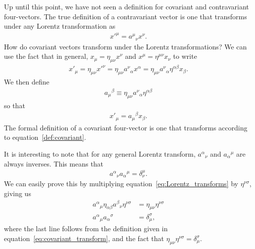\documentclass[titlepage,letterpaper,onecolumn,11pt,final]{report}
\numberwithin{equation}{section}
\numberwithin{figure}{section}
\begin{document}
Up until this point, we have not seen a definition for covariant and contravariant four-vectors. The true definition of a contravariant vector is one that transforms under any Lorentz transformation as
\begin{gather}
	\label{def:contravariant}
	{x'}^{\mu} = {a^{\mu}}_{\nu} x^{\nu}.
\end{gather}
%
How do covariant vectors transform under the Lorentz transformations? We can use the fact that in general, $x_{\mu} = \eta_{\mu \nu} x^{\nu}$ and $x^{\mu} = \eta^{\mu \nu} x_{\nu}$ to write
\begin{gather}
	{x'}_{\mu} = \eta_{\mu \nu} {x'}^{\nu} = \eta_{\mu \nu} {a^{\nu}}_{\alpha} x^{\alpha} = \eta_{\mu \nu} {a^{\nu}}_{\alpha} \eta^{\alpha \beta} x_{\beta} .
\end{gather}
%
We then define
\begin{gather}
	\label{eq:covariant_transform}
	{a_{\mu}}^{\beta} \equiv \eta_{\mu \nu} {a^{\nu}}_{\alpha} \eta^{\alpha \beta}
\end{gather}
so that
\begin{gather}
	\label{def:covariant}
	{x'}_{\mu} = {a_{\mu}}^{\beta} x_{\beta} .
\end{gather}
The formal definition of a covariant four-vector is one that transforms according to equation~\ref{def:covariant}. 

It is interesting to note that for any general Lorentz transform, ${a^{\alpha}}_{\nu}$ and ${a_{\alpha}}^{\mu}$ are always inverses. This means that 
\begin{gather}
	{a^{\alpha}}_{\nu} {a_{\alpha}}^{\mu} = \delta^{\mu}_{\nu} .
\end{gather}
%
We can easily prove this by multiplying equation~\ref{eq:Lorentz_transforms} by $\eta^{\nu \sigma}$, giving us
\begin{subequations}
\begin{align}
	\label{eq:lorentz_inversions1}
	{a^{\alpha}}_{\mu} \eta_{\alpha \beta} {a^{\beta}}_{\nu} \eta^{\nu \sigma} &= \eta_{\mu \nu} \eta^{\nu \sigma} \\
	\label{eq:lorentz_inversions2}
	{a^{\alpha}}_{\mu} {a_{\alpha}}^{\sigma} &= \delta^{\sigma}_{\mu},
\end{align}
\end{subequations}
where the last line follows from the definition given in equation~\ref{eq:covariant_transform}, and the fact that $\eta_{\mu \nu} \eta^{\nu \sigma} = \delta^{\sigma}_{\mu}$.
\end{document}
